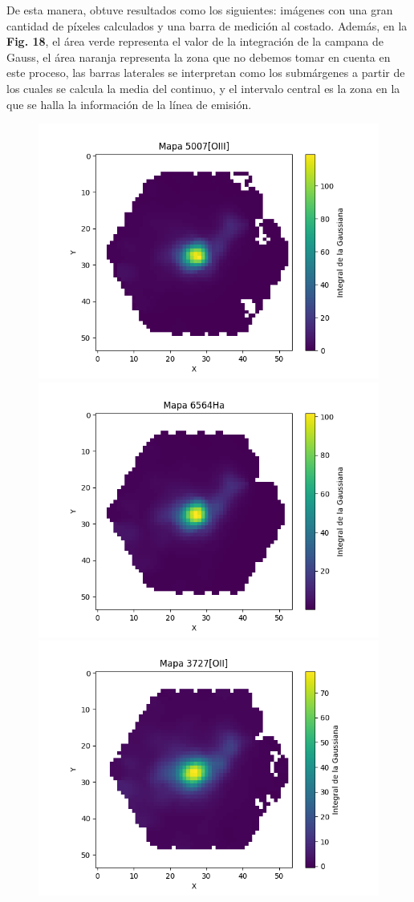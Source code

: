 \documentclass[9pt,twocolumn,a4paper]{opticajnl}
\begin{document}
De esta manera, obtuve resultados como los siguientes: imágenes con una gran cantidad de píxeles calculados y una barra de medición al costado. Además, en la \textbf{Fig. 18}, el área verde representa el valor de la integración de la campana de Gauss, el área naranja representa la zona que no debemos tomar en cuenta en este proceso, las barras laterales se interpretan como los submárgenes a partir de los cuales se calcula la media del continuo, y el intervalo central es la zona en la que se halla la información de la línea de emisión.

\begin{figure}
    \centering
    \includegraphics[width=0.8\linewidth]{../Codigos/extractorLineasEmision/imgs/imgs7495-6102_lines/img7495-6102_[OIII]_5007_.png}
    \includegraphics[width=0.8\linewidth]{../Codigos/extractorLineasEmision/imgs/imgs7495-6102_lines/img7495-6102_Ha_6564_.png}
    \includegraphics[width=0.8\linewidth]{../Codigos/extractorLineasEmision/imgs/imgs7495-6102_lines/img7495-6102_[OII]_3727_.png}

\end{figure}
\end{document}
